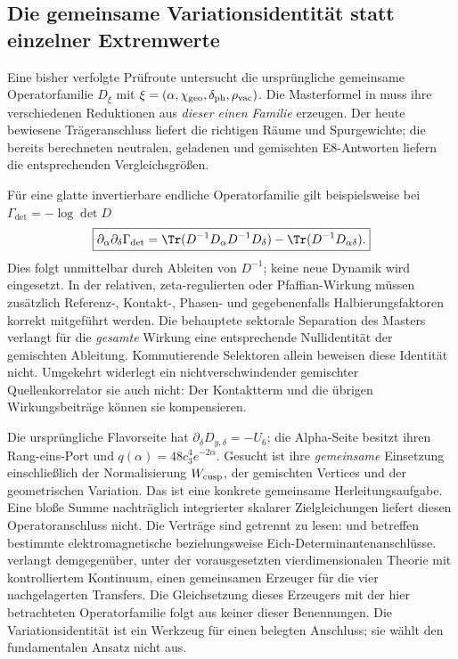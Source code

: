 \subsection{Die gemeinsame Variationsidentität statt einzelner Extremwerte}\label{sec:commonvariation}
Eine bisher verfolgte Prüfroute untersucht die ursprüngliche gemeinsame Operatorfamilie $D_\xi$ mit
$\xi=(\alpha,\chi_{\rm geo},\delta_{\rm ph},\rho_{\rm vac})$.
Die Masterformel in  muss ihre verschiedenen Reduktionen aus \emph{dieser einen Familie} erzeugen.
Der heute bewiesene Trägeranschluss liefert die richtigen Räume und Spurgewichte; die bereits berechneten neutralen, geladenen und gemischten E8-Antworten liefern die entsprechenden Vergleichsgrößen.

Für eine glatte invertierbare endliche Operatorfamilie gilt beispielsweise bei $\Gamma_{\det}=-\log\det D$
\begin{equation}\label{eq:mixedvariation}
\boxed{\partial_\alpha\partial_\delta\Gamma_{\det}
=\Tr(D^{-1}D_\alpha D^{-1}D_\delta)
-\Tr(D^{-1}D_{\alpha\delta}).}
\end{equation}
Dies folgt unmittelbar durch Ableiten von $D^{-1}$; keine neue Dynamik wird eingesetzt.
In der relativen, zeta-regulierten oder Pfaffian-Wirkung müssen zusätzlich Referenz-, Kontakt-, Phasen- und gegebenenfalls Halbierungsfaktoren korrekt mitgeführt werden.
Die behauptete sektorale Separation des Masters verlangt für die \emph{gesamte} Wirkung eine entsprechende Nullidentität der gemischten Ableitung.
Kommutierende Selektoren allein beweisen diese Identität nicht.
Umgekehrt widerlegt ein nichtverschwindender gemischter Quellenkorrelator sie auch nicht: Der Kontaktterm und die übrigen Wirkungsbeiträge können sie kompensieren.

Die ursprüngliche Flavorseite hat $\partial_\delta D_{y,\delta}=-U_6$; die Alpha-Seite besitzt ihren Rang-eins-Port und $q(\alpha)=48c_3^4e^{-2\alpha}$.
Gesucht ist ihre \emph{gemeinsame} Einsetzung einschließlich der Normalisierung $W_{\rm cusp}$, der gemischten Vertices und der geometrischen Variation.
Das ist eine konkrete gemeinsame Herleitungsaufgabe. Eine bloße Summe nachträglich integrierter skalarer Zielgleichungen liefert diesen Operatoranschluss nicht.
Die Verträge sind getrennt zu lesen:  und  betreffen bestimmte elektromagnetische beziehungsweise Eich-Determinantenanschlüsse.  verlangt demgegenüber, unter der vorausgesetzten vierdimensionalen Theorie mit kontrolliertem Kontinuum, einen gemeinsamen Erzeuger für die vier nachgelagerten Transfers. Die Gleichsetzung dieses Erzeugers mit der hier betrachteten Operatorfamilie folgt aus keiner dieser Benennungen. Die Variationsidentität ist ein Werkzeug für einen belegten Anschluss; sie wählt den fundamentalen Ansatz nicht aus.

